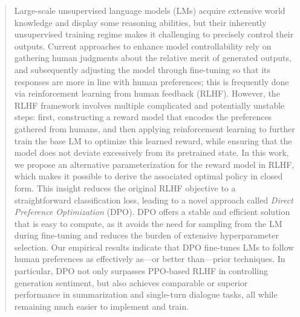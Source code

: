 \begin{abstract}
Large-scale unsupervised language models (LMs) acquire extensive world knowledge and display some reasoning abilities, but their inherently unsupervised training regime makes it challenging to precisely control their outputs. Current approaches to enhance model controllability rely on gathering human judgments about the relative merit of generated outputs, and subsequently adjusting the model through fine-tuning so that its responses are more in line with human preferences; this is frequently done via reinforcement learning from human feedback (RLHF). However, the RLHF framework involves multiple complicated and potentially unstable steps: first, constructing a reward model that encodes the preferences gathered from humans, and then applying reinforcement learning to further train the base LM to optimize this learned reward, while ensuring that the model does not deviate excessively from its pretrained state. In this work, we propose an alternative parameterization for the reward model in RLHF, which makes it possible to derive the associated optimal policy in closed form. This insight reduces the original RLHF objective to a straightforward classification loss, leading to a novel approach called \textit{Direct Preference Optimization} (DPO). DPO offers a stable and efficient solution that is easy to compute, as it avoids the need for sampling from the LM during fine-tuning and reduces the burden of extensive hyperparameter selection. Our empirical results indicate that DPO fine-tunes LMs to follow human preferences as effectively as—or better than—prior techniques. In particular, DPO not only surpasses PPO-based RLHF in controlling generation sentiment, but also achieves comparable or superior performance in summarization and single-turn dialogue tasks, all while remaining much easier to implement and train.
\end{abstract}

